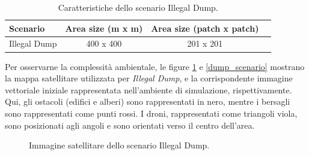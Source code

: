 \begin{table}[H]
    \centering
    
    \begin{tabular}{|l|c|c|c|}
    \hline
    \textbf{Scenario}              & \textbf{Area size (m x m)}     & \textbf{Area size (patch x patch)}      \\ \hline
    Illegal Dump                   & 400 x 400                      & 201 x 201                           \\ \hline
    \end{tabular}%
    
    \caption{Caratteristiche dello scenario Illegal Dump.}
    \label{tabella_scenario}
\end{table}

Per osservarne la complessità ambientale, le figure \ref{dump_map} e \ref{dump_scenario} mostrano la mappa satellitare utilizzata per \textit{Illegal Dump}, e la corrispondente immagine vettoriale iniziale rappresentata nell'ambiente di simulazione, rispettivamente. 
Qui, gli ostacoli (edifici e alberi) sono rappresentati in nero, mentre i bersagli sono rappresentati come punti rossi. 
I droni, rappresentati come triangoli viola, sono posizionati agli angoli e sono orientati verso il centro dell'area.

\begin{figure}[H] 
    \captionsetup{justification=centering, margin=2cm, font=footnotesize}
    \begin{center}
    \end{center}
    \caption{Immagine satellitare dello scenario Illegal Dump.}
    \label{dump_map}
\end{figure}

